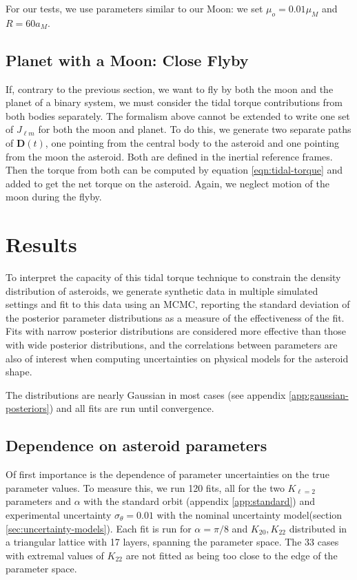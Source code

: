 \documentclass[linenumbers]{aastex631}
\begin{document}
For our tests, we use parameters similar to our Moon: we set $\mu_o = 0.01 \mu_M$ and $R = 60 a_M$.


\subsection{Planet with a Moon: Close Flyby}
If, contrary to the previous section, we want to fly by both the moon and the planet of a binary system, we must consider the tidal torque contributions from both bodies separately. The formalism above cannot be extended to write one set of $J_{\ell m}$ for both the moon and planet. To do this, we generate two separate paths of $\mathbf D(t)$, one pointing from the central body to the asteroid and one pointing from the moon the asteroid. Both are defined in the inertial reference frames. Then the torque from both can be computed by equation \ref{eqn:tidal-torque} and added to get the net torque on the asteroid. Again, we neglect motion of the moon during the flyby.



\section{Results}
To interpret the capacity of this tidal torque technique to constrain the density distribution of asteroids, we generate synthetic data in multiple simulated settings and fit to this data using an MCMC, reporting the standard deviation of the posterior parameter distributions as a measure of the effectiveness of the fit. Fits with narrow posterior distributions are considered more effective than those with wide posterior distributions, and the correlations between parameters are also of interest when computing uncertainties on physical models for the asteroid shape.

The distributions are nearly Gaussian in most cases (see appendix \ref{app:gaussian-posteriors}) and all fits are run until convergence.

\subsection{Dependence on asteroid parameters}
Of first importance is the dependence of parameter uncertainties on the true parameter values. To measure this, we run 120 fits, all for the two $K_{\ell = 2}$ parameters and $\alpha$ with the standard orbit (appendix \ref{app:standard}) and experimental uncertainty $\sigma_\theta = 0.01$ with the nominal uncertainty model(section \ref{sec:uncertainty-models}). Each fit is run for $\alpha=\pi/8$ and $K_{20}, K_{22}$ distributed in a triangular lattice with 17 layers, spanning the parameter space. The 33 cases with extremal values of $K_{22}$ are not fitted as being too close to the edge of the parameter space.
\end{document}
